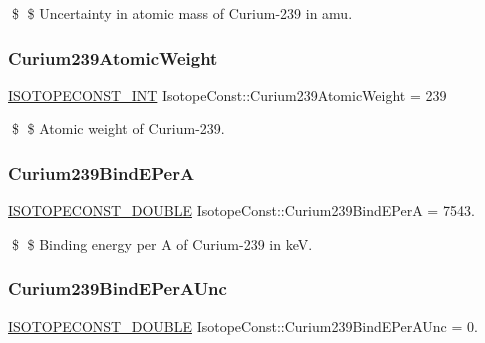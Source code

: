 \$ \$ Uncertainty in atomic mass of Curium-\/239 in amu. \mbox{\label{group___isotope_const-_curium-_cm239_gab6076bec8f7546423c6b9fc27a11d876}} 
\subsubsection{\texorpdfstring{Curium239\+Atomic\+Weight}{Curium239AtomicWeight}}
{\footnotesize\ttfamily \mbox{\hyperlink{group___isotope_const-_macros_ga5f18360b3e99483a35c32d789e62621c}{I\+S\+O\+T\+O\+P\+E\+C\+O\+N\+S\+T\+\_\+\+I\+NT}} Isotope\+Const\+::\+Curium239\+Atomic\+Weight = 239}

\$ \$ Atomic weight of Curium-\/239. \mbox{\label{group___isotope_const-_curium-_cm239_ga02098a3bf9ff388185ec985fa8b89f1b}} 
\subsubsection{\texorpdfstring{Curium239\+Bind\+E\+PerA}{Curium239BindEPerA}}
{\footnotesize\ttfamily \mbox{\hyperlink{group___isotope_const-_macros_ga8f45a7272ce02c0b4c65c44636ed719a}{I\+S\+O\+T\+O\+P\+E\+C\+O\+N\+S\+T\+\_\+\+D\+O\+U\+B\+LE}} Isotope\+Const\+::\+Curium239\+Bind\+E\+PerA = 7543.}

\$ \$ Binding energy per A of Curium-\/239 in keV. \mbox{\label{group___isotope_const-_curium-_cm239_ga339b1c5cb746c903db357027afbc1e31}} 
\subsubsection{\texorpdfstring{Curium239\+Bind\+E\+Per\+A\+Unc}{Curium239BindEPerAUnc}}
{\footnotesize\ttfamily \mbox{\hyperlink{group___isotope_const-_macros_ga8f45a7272ce02c0b4c65c44636ed719a}{I\+S\+O\+T\+O\+P\+E\+C\+O\+N\+S\+T\+\_\+\+D\+O\+U\+B\+LE}} Isotope\+Const\+::\+Curium239\+Bind\+E\+Per\+A\+Unc = 0.}

